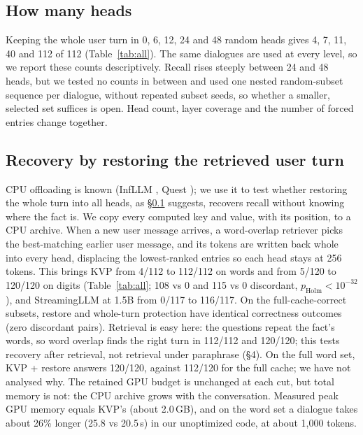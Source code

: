 \documentclass[11pt,a4paper]{article}
\newcommand{\ph}{p_\text{Holm}}
\begin{document}
\begin{table}[t]
\centering\footnotesize
\caption{Recall (correct/dialogues; $k = 4, 8$; 256 retained tokens per KV head), counted only on dialogues the full cache answers (112/120, 120/120, 117/120), so full cache is 100\% by construction. Bold: best usable method per column. Diagnostic rows force part of the fact to stay in the cache (all heads unless stated), which needs its position: a probe, not a method. ``Whole user turn'' includes chat-template tokens. Restore uses an extra CPU archive. --: not run (no KVP agents at 1.5B).}
\label{tab:all}

\end{table}

\subsection{How many heads}\label{sec:heads}
Keeping the whole user turn in 0, 6, 12, 24 and 48 random heads gives 4, 7, 11, 40 and 112 of 112 (Table~\ref{tab:all}). The same dialogues are used at every level, so we report these counts descriptively. Recall rises steeply between 24 and 48 heads, but we tested no counts in between and used one nested random-subset sequence per dialogue, without repeated subset seeds, so whether a smaller, selected set suffices is open. Head count, layer coverage and the number of forced entries change together.

\subsection{Recovery by restoring the retrieved user turn}\label{sec:fix}
CPU offloading is known (InfLLM \cite{infllm}, Quest \cite{quest}); we use it to test whether restoring the whole turn into all heads, as \S\ref{sec:heads} suggests, recovers recall without knowing where the fact is. We copy every computed key and value, with its position, to a CPU archive. When a new user message arrives, a word-overlap retriever picks the best-matching earlier user message, and its tokens are written back whole into every head, displacing the lowest-ranked entries so each head stays at 256 tokens. This brings KVP from 4/112 to 112/112 on words and from 5/120 to 120/120 on digits (Table~\ref{tab:all}; 108 vs 0 and 115 vs 0 discordant, $\ph < 10^{-32}$), and StreamingLLM at 1.5B from 0/117 to 116/117. On the full-cache-correct subsets, restore and whole-turn protection have identical correctness outcomes (zero discordant pairs). Retrieval is easy here: the questions repeat the fact's words, so word overlap finds the right turn in 112/112 and 120/120; this tests recovery after retrieval, not retrieval under paraphrase (\S4). On the full word set, KVP + restore answers 120/120, against 112/120 for the full cache; we have not analysed why. The retained GPU budget is unchanged at each cut, but total memory is not: the CPU archive grows with the conversation. Measured peak GPU memory equals KVP's (about 2.0\,GB), and on the word set a dialogue takes about 26\% longer (25.8 vs 20.5\,s) in our unoptimized code, at about 1,000 tokens.
\end{document}
